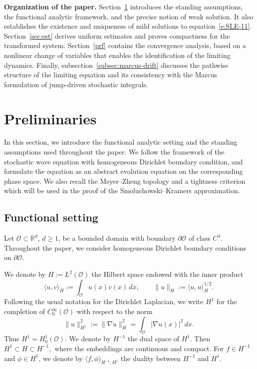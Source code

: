 \documentclass[11pt]{article}
\theoremstyle{plain}
\numberwithin{equation}{section}
\begin{document}
\medskip
\noindent\textbf{Organization of the paper.}
Section~\ref{sec:pre} introduces the standing assumptions, the functional analytic framework, and the precise notion of weak solution. It also establishes the existence and uniqueness of mild solutions to equation~\eqref{e:SLE-11}.  
Section~\ref{sec:est} derives uniform estimates and proves compactness for the transformed system.   
Section~\ref{prf} contains the convergence analysis, based on a nonlinear change of variables that enables the identification of the limiting dynamics.
Finally, subsection~\ref{subsec:marcus-drift} discusses the pathwise structure of the limiting equation and its consistency with the Marcus formulation of jump-driven stochastic integrals.




 
 

 
 
 


\section{Preliminaries}\label{sec:pre}

In this section, we introduce the functional analytic setting and the
standing assumptions used throughout the paper. We follow the framework of
the stochastic wave equation with homogeneous Dirichlet boundary condition,
and formulate the equation as an abstract evolution equation on the
corresponding phase space. We also recall the Meyer--Zheng topology and a
tightness criterion which will be used in the proof of the
Smoluchowski--Kramers approximation.

\subsection{Functional setting}

Let \(\mathcal O\subset \mathbb R^d\), \(d\ge1\), be a bounded domain with
boundary \(\partial\mathcal O\) of class \(C^3\). Throughout the paper, we
consider homogeneous Dirichlet boundary conditions on \(\partial\mathcal O\).

We denote by \( H:=L^2(\mathcal O)\) the Hilbert space endowed with the inner product
\[
\langle u,v\rangle_H := \int_{\mathcal O}u(x)v(x)\,dx, \qquad \|u\|_H:=\langle u,u\rangle_H^{1/2}.
\]
Following the usual notation for the Dirichlet Laplacian, we write \(H^1\)
for the completion of \(C_0^\infty(\mathcal O)\) with respect to the norm
\[
\|u\|_{H^1}^2:=\|\nabla u\|_H^2=\int_{\mathcal O}|\nabla u(x)|^2\,dx .
\]
Thus \(H^1=H_0^1(\mathcal O)\). We denote by \(H^{-1}\) the dual space of \(H^1\). Then \(H^1\subset H\subset H^{-1},\)
where the embeddings are continuous and compact. For \(f\in H^{-1}\) and \(\phi\in H^1\), we denote by
\(\langle f,\phi\rangle_{H^{-1},H^1}\) the duality between \(H^{-1}\) and \(H^1\). 
\end{document}
